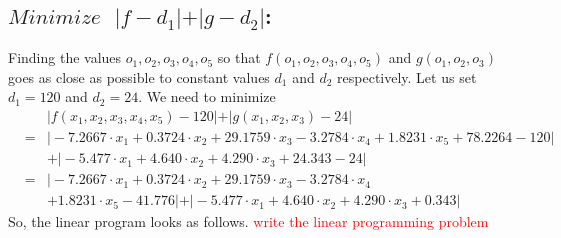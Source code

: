 \documentclass[12pt]{article}
\begin{document}
\subsection{$Minimize \text{ } \vert f-d_1 \vert + \vert g-d_2 \vert$:} Finding the values $o_1,o_2,o_3,o_4,o_5$ so that $f(o_1,o_2,o_3,o_4,o_5)$ and $g(o_1,o_2,o_3)$  goes as close as possible to constant values $d_1$ and $d_2$ respectively. Let us set $d_1 = 120$ and $d_2 = 24$. We need to minimize
\begin{eqnarray*}
& &\vert f(x_1,x_2,x_3,x_4,x_5)-120 \vert + \vert g(x_1,x_2,x_3)-24 \vert \\ 
&=& \vert -7.2667 \cdot x_1 + 0.3724 \cdot x_2 + 29.1759 \cdot x_3 - 3.2784 \cdot x_4 + 1.8231 \cdot x_5 + 78.2264 - 120 \vert \\
& & + \vert -5.477 \cdot x_1 + 4.640 \cdot x_2 + 4.290 \cdot x_3 + 24.343 -24 \vert \\
& = &  \vert -7.2667 \cdot x_1 + 0.3724 \cdot x_2 + 29.1759 \cdot x_3 - 3.2784 \cdot x_4\\
& & + 1.8231 \cdot x_5 - 41.776 \vert + \vert -5.477 \cdot x_1 + 4.640 \cdot x_2 + 4.290 \cdot x_3 + 0.343 \vert
\end{eqnarray*}
So, the linear program looks as follows. \textcolor{red}{write the linear programming problem}
\end{document}
